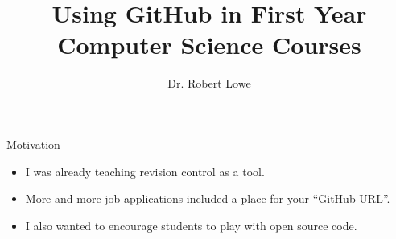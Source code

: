 \documentclass[handout]{beamer}
\title{Using GitHub in First Year Computer Science Courses}
\author{Dr. Robert Lowe\\}
\institute[Maryville College] %
{
  Division of Mathematics and Computer Science\\
  Maryville College
}
\date[]{}
\begin{document}
\begin{frame}
  \titlepage
\end{frame}





\begin{frame}{Motivation}
    \begin{itemize}
        \item I was already teaching revision control as a tool.
        \item More and more job applications included a place for
            your ``GitHub URL''.
        \item I also wanted to encourage students to play with open
            source code.
    \end{itemize}
\end{frame}
\end{document}
